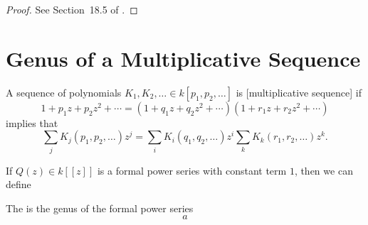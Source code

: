 \begin{proof}
	See Section~18.5 of \cite{fomenko2009homotopical}.
\end{proof}

\section{Genus of a Multiplicative Sequence}

\begin{definition}
	A sequence of polynomials $K_1,K_2,\ldots \in k[p_1,p_2,\ldots]$ is [multiplicative sequence] if
	\[
		1 + p_1z + p_2z^2 + \cdots =
		(1+q_1 z + q_2 z^2 + \cdots)
		(1+r_1 z + r_2 z^2 + \cdots)
	\]
	implies that
	\[
		\sum_j K_j(p_1,p_2,\ldots) z^j = \sum_i K_i(q_1,q_2,\ldots)z^i \sum_k K_k (r_1,r_2,\ldots) z^k.
	\]
\end{definition}

If $Q(z)\in k[\![z]\!]$ is a formal power series with constant term $1$, then we can define

\begin{definition}
	The  is the genus of the formal power series
	\[
		a
	\]
\end{definition}
